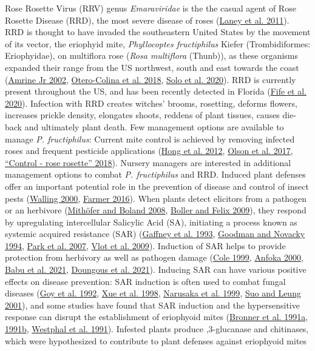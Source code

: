 \documentclass{ufdissertation}[overrideChapters] %
\begin{document}
{Rose Rosette Virus (RRV) genus \emph{Emaraviridae} is the the casual agent of Rose Rosette Disease (RRD), the most severe disease of roses (\protect\hyperlink{ref-Laney2011}{Laney et al. 2011}). RRD is thought to have invaded the southeastern United States by the movement of its vector, the eriophyid mite, \emph{Phyllocoptes fructiphilus} Kiefer (Trombidiformes: Eriophyidae), on multiflora rose (\emph{Rosa multiflora} (Thunb)), as these organisms expanded their range from the US northwest, south and east towards the coast (\protect\hyperlink{ref-Amrine2002}{Amrine Jr 2002}, \protect\hyperlink{ref-Otero-Colina2018}{Otero-Colina et al. 2018}, \protect\hyperlink{ref-Solo2020}{Solo et al. 2020}). RRD is currently present throughout the US, and has been recently detected in Florida (\protect\hyperlink{ref-Fife2020}{Fife et al. 2020}). Infection with RRD creates witches' brooms, rosetting, deforms flowers, increases prickle density, elongates shoots, reddens of plant tissues, causes die-back and ultimately plant death. Few management options are available to manage \emph{P. fructiphilus}: Current mite control is achieved by removing infected roses and frequent pesticide applications (\protect\hyperlink{ref-Hong2012}{Hong et al. 2012}, \protect\hyperlink{ref-Olson2017}{Olson et al. 2017}, \protect\hyperlink{ref-UGA2018}{{``Control - rose rosette''} 2018}). Nursery managers are interested in additional management options to combat \emph{P. fructiphilus} and RRD. Induced plant defenses offer an important potential role in the prevention of disease and control of insect pests (\protect\hyperlink{ref-Walling2000}{Walling 2000}, \protect\hyperlink{ref-Farmer2016}{Farmer 2016}). When plants detect elicitors from a pathogen or an herbivore (\protect\hyperlink{ref-Mithoefer2008}{Mithöfer and Boland 2008}, \protect\hyperlink{ref-Boller2009}{Boller and Felix 2009}), they respond by upregulating intercellular Salicylic Acid (SA), initiating a process known as systemic acquired resistance (SAR) (\protect\hyperlink{ref-Gaffney1993}{Gaffney et al. 1993}, \protect\hyperlink{ref-Goodman1994}{Goodman and Novacky 1994}, \protect\hyperlink{ref-Park2007}{Park et al. 2007}, \protect\hyperlink{ref-Vlot2009}{Vlot et al. 2009}). Induction of SAR helps to provide protection from herbivory as well as pathogen damage (\protect\hyperlink{ref-Cole1999}{Cole 1999}, \protect\hyperlink{ref-Anfoka2000}{Anfoka 2000}, \protect\hyperlink{ref-Babu2021}{Babu et al. 2021}, \protect\hyperlink{ref-Doungous2021}{Doungous et al. 2021}). Inducing SAR can have various positive effects on disease prevention: SAR induction is often used to combat fungal diseases (\protect\hyperlink{ref-Goy1992}{Goy et al. 1992}, \protect\hyperlink{ref-Xue1998}{Xue et al. 1998}, \protect\hyperlink{ref-Narusaka1999}{Narusaka et al. 1999}, \protect\hyperlink{ref-Suo2001}{Suo and Leung 2001}), and some studies have found that SAR induction and the hypersensitive response can disrupt the establishment of eriophyoid mites (\protect\hyperlink{ref-Bronner1991}{Bronner et al. 1991a}, \protect\hyperlink{ref-Bronner1991a}{1991b}, \protect\hyperlink{ref-Westphal1991}{Westphal et al. 1991}). Infested plants produce ,3-glucanase and chitinases, which were hypothesized to contribute to plant defenses against eriophyoid mites }
\end{document}
